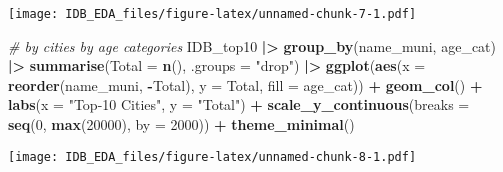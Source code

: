 \documentclass[
]{article}
\newenvironment{Shaded}{\begin{snugshade}}{\end{snugshade}}
\newcommand{\AttributeTok}[1]{\textcolor[rgb]{0.13,0.29,0.53}{#1}}
\newcommand{\CommentTok}[1]{\textcolor[rgb]{0.56,0.35,0.01}{\textit{#1}}}
\newcommand{\DecValTok}[1]{\textcolor[rgb]{0.00,0.00,0.81}{#1}}
\newcommand{\FunctionTok}[1]{\textcolor[rgb]{0.13,0.29,0.53}{\textbf{#1}}}
\newcommand{\NormalTok}[1]{#1}
\newcommand{\SpecialCharTok}[1]{\textcolor[rgb]{0.81,0.36,0.00}{\textbf{#1}}}
\newcommand{\StringTok}[1]{\textcolor[rgb]{0.31,0.60,0.02}{#1}}
\begin{document}
\texttt{[image: IDB\_EDA\_files/figure-latex/unnamed-chunk-7-1.pdf]}

\begin{Shaded}
\begin{Highlighting}[]
\CommentTok{\# by cities by age categories}
\NormalTok{IDB\_top10 }\SpecialCharTok{|\textgreater{}}
  \FunctionTok{group\_by}\NormalTok{(name\_muni, age\_cat) }\SpecialCharTok{|\textgreater{}}
  \FunctionTok{summarise}\NormalTok{(}\AttributeTok{Total =} \FunctionTok{n}\NormalTok{(), }\AttributeTok{.groups =} \StringTok{"drop"}\NormalTok{) }\SpecialCharTok{|\textgreater{}}
  \FunctionTok{ggplot}\NormalTok{(}\FunctionTok{aes}\NormalTok{(}\AttributeTok{x =} \FunctionTok{reorder}\NormalTok{(name\_muni, }\SpecialCharTok{{-}}\NormalTok{Total), }\AttributeTok{y =}\NormalTok{ Total, }\AttributeTok{fill =}\NormalTok{ age\_cat)) }\SpecialCharTok{+}
  \FunctionTok{geom\_col}\NormalTok{() }\SpecialCharTok{+}
  \FunctionTok{labs}\NormalTok{(}\AttributeTok{x =} \StringTok{"Top{-}10 Cities"}\NormalTok{, }\AttributeTok{y =} \StringTok{"Total"}\NormalTok{) }\SpecialCharTok{+}
  \FunctionTok{scale\_y\_continuous}\NormalTok{(}\AttributeTok{breaks =} \FunctionTok{seq}\NormalTok{(}\DecValTok{0}\NormalTok{, }\FunctionTok{max}\NormalTok{(}\DecValTok{20000}\NormalTok{), }\AttributeTok{by =} \DecValTok{2000}\NormalTok{)) }\SpecialCharTok{+}
  \FunctionTok{theme\_minimal}\NormalTok{()}
\end{Highlighting}
\end{Shaded}

\texttt{[image: IDB\_EDA\_files/figure-latex/unnamed-chunk-8-1.pdf]}
\end{document}
